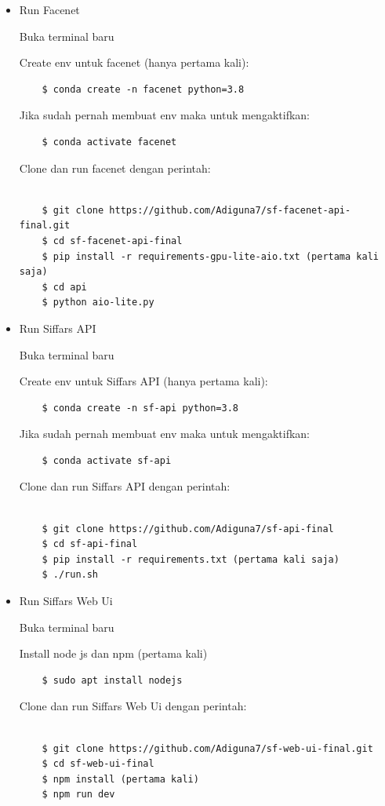 \begin{itemize}
  \item Run Facenet
  
  Buka terminal baru 

  Create env untuk facenet (hanya pertama kali):
  \begin{lstlisting}
    $ conda create -n facenet python=3.8
  \end{lstlisting}
  Jika sudah pernah membuat env maka untuk mengaktifkan:
  \begin{lstlisting}
    $ conda activate facenet
  \end{lstlisting}
  Clone dan run facenet dengan perintah:
  \begin{lstlisting}

    $ git clone https://github.com/Adiguna7/sf-facenet-api-final.git        
    $ cd sf-facenet-api-final
    $ pip install -r requirements-gpu-lite-aio.txt (pertama kali saja)
    $ cd api
    $ python aio-lite.py
  \end{lstlisting}

  \item Run Siffars API
  
  Buka terminal baru 
  
  Create env untuk Siffars API (hanya pertama kali):
  \begin{lstlisting}
    $ conda create -n sf-api python=3.8
  \end{lstlisting}
  Jika sudah pernah membuat env maka untuk mengaktifkan:
  \begin{lstlisting}
    $ conda activate sf-api
  \end{lstlisting}
  Clone dan run Siffars API dengan perintah:
  \begin{lstlisting}

    $ git clone https://github.com/Adiguna7/sf-api-final
    $ cd sf-api-final
    $ pip install -r requirements.txt (pertama kali saja)
    $ ./run.sh
  \end{lstlisting}

  \item Run Siffars Web Ui
  
  Buka terminal baru

  Install node js dan npm (pertama kali)
  \begin{lstlisting}
    $ sudo apt install nodejs
  \end{lstlisting}

  Clone dan run Siffars Web Ui dengan perintah:
  \begin{lstlisting}

    $ git clone https://github.com/Adiguna7/sf-web-ui-final.git
    $ cd sf-web-ui-final
    $ npm install (pertama kali)
    $ npm run dev
  \end{lstlisting}


\end{itemize}
